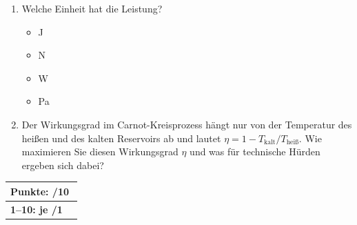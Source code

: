 \documentclass[11pt, a4paper]{article}
\begin{document}
\begin{enumerate}[label=\arabic*.,itemsep=18pt]
    \item Welche Einheit hat die Leistung?
    \begin{itemize}[label={$\square$},itemsep=1pt,topsep=0pt]
        \item \si{\joule}
        \item \si{\newton}
        \item \si{\watt}
        \item \si{\pascal}
    \end{itemize}

    \item Der Wirkungsgrad im Carnot-Kreisprozess hängt nur von der Temperatur des heißen und des kalten Reservoirs ab und lautet $\eta = 1 - T_{\text{kalt}}/T_{\text{heiß}}$. Wie maximieren Sie diesen Wirkungsgrad $\eta$ und was für technische Hürden ergeben sich dabei? 
    
\end{enumerate}

\vfill
\begin{flushright}
\renewcommand{\arraystretch}{1.23}
\begin{tabular}{|l c|}
\hline
\multicolumn{2}{|l|}{\textbf{\large{Punkte: \quad\quad\quad /10}}}\\
\hline
\textbf{1--10: je /1} & \\
\hline
\end{tabular}
\end{flushright}
\end{document}
